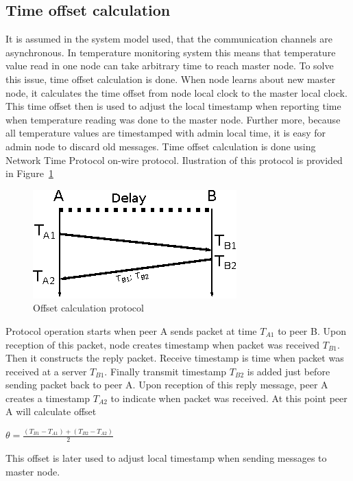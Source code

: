 \subsection{Time offset calculation}
\label{subsec:timesync}
It is assumed in the system model used, that the communication channels are asynchronous. In temperature monitoring system this means that temperature value read in one node can take arbitrary time to reach master node. To solve this issue, time offset calculation is done. When node learns about new master node, it calculates the time offset from node local clock to the master local clock. This time offset then is used to adjust the local timestamp when reporting time when temperature reading was done to the master node. Further more, because all temperature values are timestamped with admin local time, it is easy for admin node to discard old messages. Time offset calculation is done using Network Time Protocol on-wire protocol. Ilustration of this protocol is provided in Figure~\ref{fig:timeoffset}
\begin{figure}[ht!]
\centering
    \includegraphics[scale=1]{eps/NTP_onwire_diagram}
\caption{Offset calculation protocol}
\label{fig:timeoffset}
\end{figure}

Protocol operation starts when peer A sends packet at time $T_{A1}$ to peer B. Upon reception of this packet, node creates timestamp when packet was received $T_{B1}$. Then it constructs the reply packet. Receive timestamp is time when packet was received at a server $T_{B1}$. Finally transmit timestamp $T_{B2}$ is added just before sending packet back to peer A. Upon reception of this reply message, peer A creates a timestamp $T_{A2}$ to indicate when packet was received. At this point peer A will calculate offset 

$\theta=\frac{(T_{B1}-T_{A1})+(T_{B2}-T_{A2})}{2}$

This offset is later used to adjust local timestamp when sending messages to master node.

